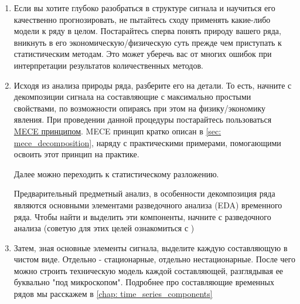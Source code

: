\begin{enumerate}
  \item Если вы хотите глубоко разобраться в структуре
    сигнала и научиться его качественно прогнозировать, не пытайтесь
    сходу применять какие-либо модели к ряду в целом. Постарайтесь сперва
    понять природу вашего ряда, вникнуть в его
    экономическую/физическую суть прежде чем приступать к
    статистическим методам. Это может уберечь вас от многих ошибок при
    интерпретации результатов количественных методов.
  \item Исходя из анализа природы ряда, разберите его на
    детали. То есть, начните с декомпозиции сигнала на составляющие с
    максимально простыми свойствами, по возможности опираясь при этом на
    физику/экономику явления. При проведении
    данной процедуры постарайтесь пользоваться
    \href{https://en.wikipedia.org/wiki/MECE_principle}{MECE
    принципом}. MECE принцип кратко описан в
    \autoref{sec: mece_decomposition}, наряду с практическими примерами,
    помогающими освоить этот принцип на практике.

    Далее можно переходить к статистическому разложению.


    Предварительный предметный
    анализ, в особенности декомпозиция ряда являются основными
    элементами разведочного анализа (EDA) временного ряда.
    Чтобы найти и выделить эти компоненты, начните с разведочного
    анализа (советую для этих целей ознакомиться с \cite{tukeyEDA1981})

  \item Затем, зная основные элементы сигнала, выделите каждую
    составляющую в чистом виде. Отдельно - стационарные, отдельно
    нестационарные. После чего можно строить
    техническую модель каждой
    составляющей, разглядывая ее буквально "под микроскопом".
    Подробнее про составляющие временных рядов мы расскажем в
    \autoref{chap: time_series_components}


\end{enumerate}
